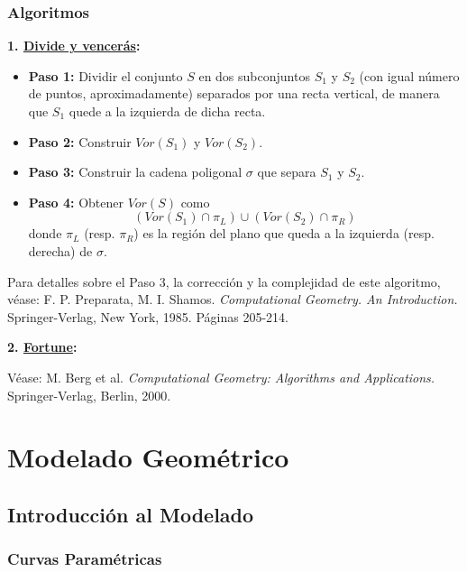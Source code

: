 \documentclass[twoside]{report}
\begin{document}
\subsection{Algoritmos}

\textbf{1. \underline{Divide y vencer\'{a}s}:}

\begin{itemize}

  \item \textbf{Paso 1:} Dividir el conjunto $S$ en dos subconjuntos $S_1$ y $S_2$ (con igual n\'{u}mero de puntos, aproximadamente) se\-pa\-ra\-dos por una recta vertical, de manera que $S_1$ quede a la izquierda de dicha recta.

  \item \textbf{Paso 2:} Construir $Vor(S_1)$ y $Vor(S_2)$.

  \item \textbf{Paso 3:} Construir la cadena poligonal $\sigma$ que separa $S_1$ y $S_2$.

  \item \textbf{Paso 4:} Obtener $Vor(S)$ como $$(Vor(S_1)\cap\pi_L)\cup (Vor(S_2)\cap\pi_R)$$ donde $\pi_L$ (resp. $\pi_R$) es la regi\'{o}n del plano que queda a la izquierda (resp. derecha) de $\sigma$.

\end{itemize}

 Para detalles sobre el Paso 3, la correcci\'{o}n y la
complejidad de este algoritmo, v\'{e}ase: {\sc F. P. Preparata, M. I.
Shamos}. {\it Computational Geometry. An Introduction.}
Springer-Verlag, New York, 1985. P\'{a}ginas 205-214.

\vspace{0.3cm}

\textbf{2. \underline{Fortune}:}

\vspace{0.3cm}

V\'{e}ase: {\sc M. Berg et al.} {\it Computational
Geometry: Algorithms and Applications.} Springer-Verlag, Berlin,
2000.

\chapter{Modelado Geométrico}


\section{Introducción al Modelado}

\subsection{Curvas Paramétricas}
\end{document}

